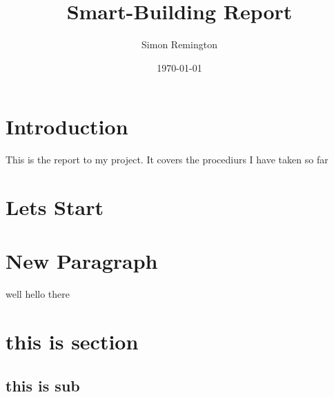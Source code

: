 \documentclass[a4paper,12pt]{article}
\begin{document}
	\pagestyle{empty}%
\title{Smart-Building Report}
\author{Simon Remington}
\date{\today}
\maketitle
\newpage

\tableofcontents
\newpage

\section{Introduction}
This is the report to my project. It covers the procediurs I have taken so far
\section{Lets Start}
\newpage
\section{New Paragraph}
well hello there
\pagebreak
\section{this is section}
\subsection{this is sub}
\end{document}

